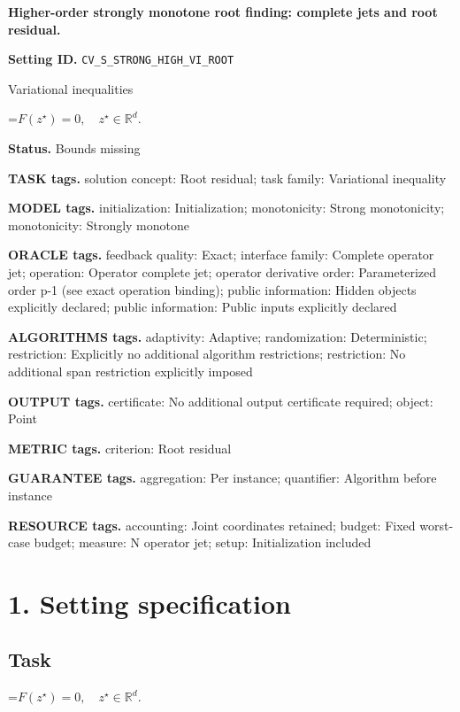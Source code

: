 \documentclass[10pt,a4paper]{article}
\newcommand{\AtlasMath}[1]{\par\begingroup\centering\setbox0=\hbox{$\displaystyle #1$}\ifdim\wd0>1.4\linewidth\typeout{ATLAS WIDE FORMULA: \the\wd0}\fi\ifdim\wd0>\linewidth\resizebox{\linewidth}{!}{\box0}\else\box0\fi\par\endgroup}
\begin{document}
\raggedright

{\LARGE\bfseries\sffamily\color{AtlasNavy} Higher-order strongly monotone root finding: complete jets and root residual.\par}\vspace{5pt}
\textbf{Setting ID.} \texttt{CV\_\allowbreak{}S\_\allowbreak{}STRONG\_\allowbreak{}HIGH\_\allowbreak{}VI\_\allowbreak{}ROOT}

Variational inequalities


\AtlasMath{F(z^\star)=0,\quad z^\star\in\mathbb{R}^d.}


\textbf{Status.} Bounds missing

\textbf{TASK tags.} solution concept: Root residual; task family: Variational inequality

\textbf{MODEL tags.} initialization: Initialization; monotonicity: Strong monotonicity; monotonicity: Strongly monotone

\textbf{ORACLE tags.} feedback quality: Exact; interface family: Complete operator jet; operation: Operator complete jet; operator derivative order: Parameterized order p-1 (see exact operation binding); public information: Hidden objects explicitly declared; public information: Public inputs explicitly declared

\textbf{ALGORITHMS tags.} adaptivity: Adaptive; randomization: Deterministic; restriction: Explicitly no additional algorithm restrictions; restriction: No additional span restriction explicitly imposed

\textbf{OUTPUT tags.} certificate: No additional output certificate required; object: Point

\textbf{METRIC tags.} criterion: Root residual

\textbf{GUARANTEE tags.} aggregation: Per instance; quantifier: Algorithm before instance

\textbf{RESOURCE tags.} accounting: Joint coordinates retained; budget: Fixed worst-case budget; measure: N operator jet; setup: Initialization included

\section{1. Setting specification}
\subsection{Task}

\AtlasMath{F(z^\star)=0,\quad z^\star\in\mathbb{R}^d.}
\end{document}
